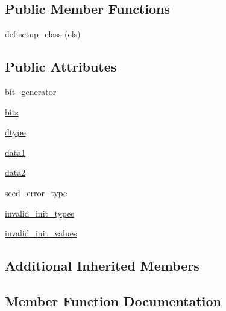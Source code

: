 \subsection*{Public Member Functions}
\begin{DoxyCompactItemize}
\item 
def \hyperlink{classnumpy_1_1random_1_1tests_1_1test__direct_1_1TestSFC64_a3586c3b203ad8f68fda7b182242933f9}{setup\+\_\+class} (cls)
\end{DoxyCompactItemize}
\subsection*{Public Attributes}
\begin{DoxyCompactItemize}
\item 
\hyperlink{classnumpy_1_1random_1_1tests_1_1test__direct_1_1TestSFC64_a49c9b39d3f2b8e3539c3a75e7598d102}{bit\+\_\+generator}
\item 
\hyperlink{classnumpy_1_1random_1_1tests_1_1test__direct_1_1TestSFC64_ad94b03f45a479b71e17a0c491e83a764}{bits}
\item 
\hyperlink{classnumpy_1_1random_1_1tests_1_1test__direct_1_1TestSFC64_a78d941c6cd3c96648250ef6e357e0e6f}{dtype}
\item 
\hyperlink{classnumpy_1_1random_1_1tests_1_1test__direct_1_1TestSFC64_a1893ca749b23c90011474a0d14318ca8}{data1}
\item 
\hyperlink{classnumpy_1_1random_1_1tests_1_1test__direct_1_1TestSFC64_a34b1b3cc8a5efda67aa162a4c9ffbbdd}{data2}
\item 
\hyperlink{classnumpy_1_1random_1_1tests_1_1test__direct_1_1TestSFC64_a83356f2e6d1aad4e1a69502654b5a8cd}{seed\+\_\+error\+\_\+type}
\item 
\hyperlink{classnumpy_1_1random_1_1tests_1_1test__direct_1_1TestSFC64_add418b9bc6c20bdaac046b32026a7ee9}{invalid\+\_\+init\+\_\+types}
\item 
\hyperlink{classnumpy_1_1random_1_1tests_1_1test__direct_1_1TestSFC64_af7ee69d6a1160477f4850347bd9374eb}{invalid\+\_\+init\+\_\+values}
\end{DoxyCompactItemize}
\subsection*{Additional Inherited Members}


\subsection{Member Function Documentation}
\mbox{\label{classnumpy_1_1random_1_1tests_1_1test__direct_1_1TestSFC64_a3586c3b203ad8f68fda7b182242933f9}} 
